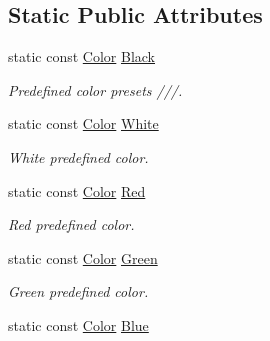 \subsection*{Static Public Attributes}
\begin{DoxyCompactItemize}
\item 
static const \hyperlink{classjetfuel_1_1draw_1_1Color}{Color} \hyperlink{classjetfuel_1_1draw_1_1Color_af7ba2fe7adb5154cde6f5563c5582988}{Black}
\begin{DoxyCompactList}\small\item\em Predefined color presets ///. \end{DoxyCompactList}\item 
\mbox{\label{classjetfuel_1_1draw_1_1Color_ab75797c1cb6e4dd952037916db39b5e8}} 
static const \hyperlink{classjetfuel_1_1draw_1_1Color}{Color} \hyperlink{classjetfuel_1_1draw_1_1Color_ab75797c1cb6e4dd952037916db39b5e8}{White}
\begin{DoxyCompactList}\small\item\em White predefined color. \end{DoxyCompactList}\item 
\mbox{\label{classjetfuel_1_1draw_1_1Color_a17b1ca508090fecb06707af5bd5e20fb}} 
static const \hyperlink{classjetfuel_1_1draw_1_1Color}{Color} \hyperlink{classjetfuel_1_1draw_1_1Color_a17b1ca508090fecb06707af5bd5e20fb}{Red}
\begin{DoxyCompactList}\small\item\em Red predefined color. \end{DoxyCompactList}\item 
\mbox{\label{classjetfuel_1_1draw_1_1Color_a529fbdf4a2a9915e3986278715a5daa8}} 
static const \hyperlink{classjetfuel_1_1draw_1_1Color}{Color} \hyperlink{classjetfuel_1_1draw_1_1Color_a529fbdf4a2a9915e3986278715a5daa8}{Green}
\begin{DoxyCompactList}\small\item\em Green predefined color. \end{DoxyCompactList}\item 
\mbox{\label{classjetfuel_1_1draw_1_1Color_a6a9b5ba6b4999d1659b7186fa239f249}} 
static const \hyperlink{classjetfuel_1_1draw_1_1Color}{Color} \hyperlink{classjetfuel_1_1draw_1_1Color_a6a9b5ba6b4999d1659b7186fa239f249}{Blue}

\end{DoxyCompactItemize}
